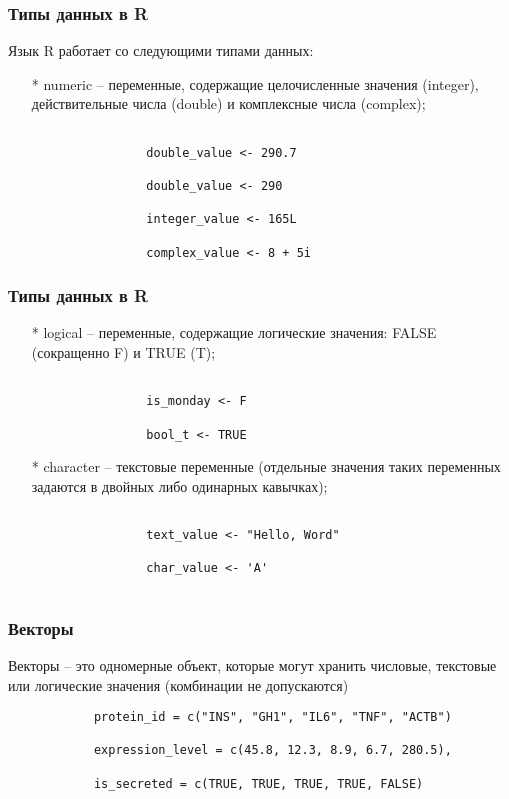 \documentclass[14pt,a4paper]{beamer}
\begin{document}
\begin{frame}[fragile]
		\frametitle{Типы данных в R}
		Язык R работает со следующими типами данных:
		\begin{itemize}
			\item[*] numeric – переменные, содержащие целочисленные значения (integer), действительные числа (double) и комплексные числа (complex);
			\begin{verbatim}
				
				double_value <- 290.7
				
				double_value <- 290
				
				integer_value <- 165L
				
				complex_value <- 8 + 5i
			\end{verbatim}	
		\end{itemize} 
	\end{frame} 
	
	\begin{frame}[fragile]
		\frametitle{Типы данных в R}
		\begin{itemize}
			\item[*] logical – переменные, содержащие логические значения: FALSE (сокращенно F) и TRUE (T);
			\begin{verbatim}
				
				is_monday <- F
				
				bool_t <- TRUE	
			\end{verbatim}	     
			\item[*] character – текстовые переменные (отдельные значения таких переменных задаются в двойных либо одинарных кавычках);
			
			\begin{verbatim}
				
				text_value <- "Hello, Word"
				
				char_value <- 'A'
				
			\end{verbatim}
		\end{itemize}    
	\end{frame}
	
	\begin{frame}[fragile]
		\frametitle{Векторы}
		Векторы – это одномерные объект, которые могут хранить числовые, текстовые или логические значения (комбинации не допускаются)
		\begin{verbatim}
			protein_id = c("INS", "GH1", "IL6", "TNF", "ACTB")
			
			expression_level = c(45.8, 12.3, 8.9, 6.7, 280.5),
			
			is_secreted = c(TRUE, TRUE, TRUE, TRUE, FALSE)
		\end{verbatim}
	\end{frame}
	
\end{document}
